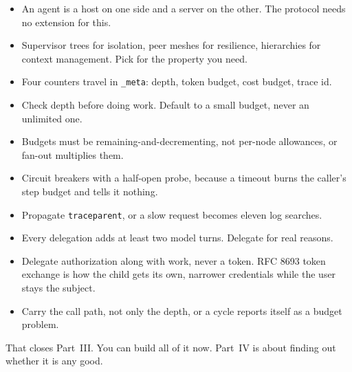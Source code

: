 \begin{itemize}[leftmargin=1.6em, itemsep=3pt]
\item An agent is a host on one side and a server on the other. The protocol
needs no extension for this.
\item Supervisor trees for isolation, peer meshes for resilience, hierarchies for
context management. Pick for the property you need.
\item Four counters travel in \texttt{\_meta}: depth, token budget, cost budget,
trace id.
\item Check depth before doing work. Default to a small budget, never an
unlimited one.
\item Budgets must be remaining-and-decrementing, not per-node allowances, or
fan-out multiplies them.
\item Circuit breakers with a half-open probe, because a timeout burns the
caller's step budget and tells it nothing.
\item Propagate \texttt{traceparent}, or a slow request becomes eleven log
searches.
\item Every delegation adds at least two model turns. Delegate for real reasons.
\item Delegate authorization along with work, never a token. RFC 8693 token
exchange is how the child gets its own, narrower credentials while the user
stays the subject. \item Carry the call path, not only the depth, or a cycle
reports itself as a budget problem.
\end{itemize}

That closes Part~III. You can build all of it now. Part~IV is about finding out
whether it is any good.
